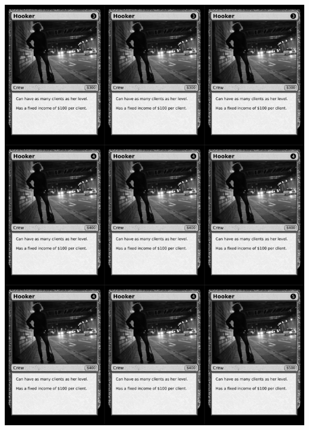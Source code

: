 \documentclass[a4paper]{article}
\begin{document}
\newpage

\begin{center}
	\centering
	\includegraphics[width=200.5mm,height=280.7mm]{output/temp/page14.png}
\end{center}
\end{document}

